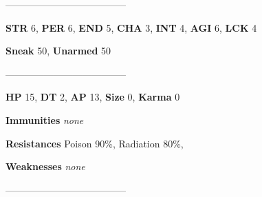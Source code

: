 \documentclass[11pt,a4paper,twocolumn]{book}
\begin{document}
%		
%	
%		

--------------------------------------

\noindent
\textbf{STR} 6, \textbf{PER} 6, \textbf{END} 5, \textbf{CHA} 3, \textbf{INT} 4, \textbf{AGI} 6, \textbf{LCK} 4

\noindent
\textbf{Sneak} 50, \textbf{Unarmed} 50 %

--------------------------------------

\noindent
\textbf{HP} 15, \textbf{DT} 2, \textbf{AP} 13, \textbf{Size} 0, \textbf{Karma} 0


\noindent
\textbf{Immunities} \emph{none} %

\noindent
\textbf{Resistances} Poison 90\%, Radiation 80\%,%

\noindent
\textbf{Weaknesses} \emph{none}%

--------------------------------------
	
\end{document}
